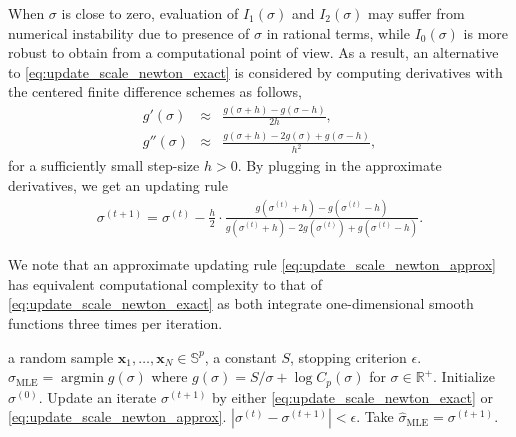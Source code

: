 \documentclass[10pt]{article}
\DeclareMathOperator*{\argmin}{argmin}
\newcommand{\bfx}{\mathbf{x}}
\newcommand{\bbS}{\mathbb{S}}
\newcommand{\bbRpos}{\mathbb{R}^+}
\newcommand{\mlescale}{\hat{\sigma}_{\textrm{MLE}}}
\begin{document}
When $\sigma$ is close to zero, evaluation of $I_1(\sigma)$ and $I_2 (\sigma)$ may suffer from numerical instability due to presence of $\sigma$ in rational terms, while $I_0 (\sigma)$ is more robust to obtain from a computational point of view. As a result, an alternative to \eqref{eq:update_scale_newton_exact} is considered by computing derivatives with the centered finite difference schemes as follows,
\begin{eqnarray*}
	g'(\sigma) &\approx& \frac{g(\sigma+h) - g(\sigma-h)}{2h}, \\
	g''(\sigma) &\approx& \frac{g(\sigma+h) - 2g(\sigma) + g(\sigma-h)}{h^2},
\end{eqnarray*}
for a sufficiently small step-size $h>0$. By plugging in the approximate derivatives, we get an updating rule
\begin{eqnarray}
\sigma^{(t+1)} = \sigma^{(t)} - \frac{h}{2} \cdot \frac{g(\sigma^{(t)}+h) - g(\sigma^{(t)}-h)}{g(\sigma^{(t)}+h) - 2g(\sigma^{(t)}) + g(\sigma^{(t)}-h)}
.\label{eq:update_scale_newton_approx}	
\end{eqnarray}


We note that an approximate updating rule \eqref{eq:update_scale_newton_approx} has equivalent computational complexity to that of \eqref{eq:update_scale_newton_exact} as both integrate one-dimensional smooth functions three times per  iteration.%






\begin{algorithm}[t]
	\caption{Maximum likelihood estimation of the scale parameter}
	\label{code:algorithm_scale}
	\begin{algorithmic}
		\REQUIRE a random sample $\bfx_1, \ldots, \bfx_N \in \bbS^p$, a constant $S$, stopping criterion $\epsilon$.
		\ENSURE $\mlescale = \argmin g(\sigma)$ where $g(\sigma) = S/\sigma + \log C_p (\sigma)$ for $\sigma \in \bbRpos$. 
		\STATE Initialize $\sigma^{(0)}$. 
		\REPEAT 
		\STATE Update an iterate $\sigma^{(t+1)}$ by either \eqref{eq:update_scale_newton_exact} or \eqref{eq:update_scale_newton_approx}.
		\UNTIL $|\sigma^{(t)} - \sigma^{(t+1)}|<\epsilon$.
		\STATE  Take $\mlescale = \sigma^{(t+1)}$.
	\end{algorithmic}
\end{algorithm}




\end{document}
